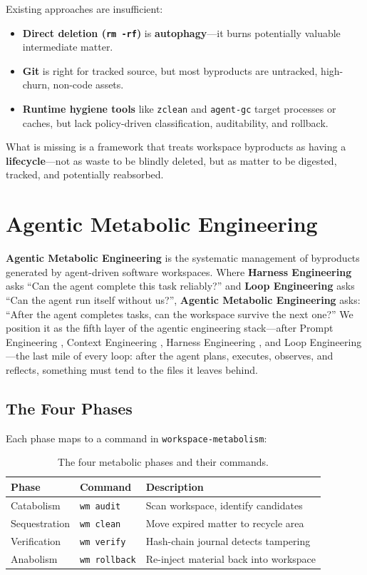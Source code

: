 \documentclass[sigconf]{acmart}
\begin{document}
Existing approaches are insufficient:
\begin{itemize}
\item \textbf{Direct deletion (\texttt{rm -rf})} is \textbf{autophagy}---it burns potentially valuable intermediate matter.
\item \textbf{Git} is right for tracked source, but most byproducts are untracked, high-churn, non-code assets.
\item \textbf{Runtime hygiene tools} like \texttt{zclean} \cite{zclean2026} and \texttt{agent-gc} \cite{jeong2026agentgc} target processes or caches, but lack policy-driven classification, auditability, and rollback.
\end{itemize}

What is missing is a framework that treats workspace byproducts as having a \textbf{lifecycle}---not as waste to be blindly deleted, but as matter to be digested, tracked, and potentially reabsorbed.

\section{Agentic Metabolic Engineering}
\textbf{Agentic Metabolic Engineering} is the systematic management of byproducts generated by agent-driven software workspaces. Where \textbf{Harness Engineering} \cite{harness2026} asks ``Can the agent complete this task reliably?'' and \textbf{Loop Engineering} \cite{loops2026} asks ``Can the agent run itself without us?'', \textbf{Agentic Metabolic Engineering} asks: ``After the agent completes tasks, can the workspace survive the next one?'' We position it as the fifth layer of the agentic engineering stack---after Prompt Engineering \cite{schulhoff2024}, Context Engineering \cite{context2025}, Harness Engineering \cite{harness2026}, and Loop Engineering \cite{loops2026}---the last mile of every loop: after the agent plans, executes, observes, and reflects, something must tend to the files it leaves behind.

\subsection{The Four Phases}
Each phase maps to a command in \texttt{workspace-metabolism}:
\begin{table}[h]
\caption{The four metabolic phases and their commands.}
\label{tab:phases}
\begin{tabular}{lll}
\textbf{Phase} & \textbf{Command} & \textbf{Description}\\
\hline
Catabolism & \texttt{wm audit} & Scan workspace, identify candidates\\
Sequestration & \texttt{wm clean} & Move expired matter to recycle area\\
Verification & \texttt{wm verify} & Hash-chain journal detects tampering\\
Anabolism & \texttt{wm rollback} & Re-inject material back into workspace\\
\end{tabular}
\end{table}
\end{document}
